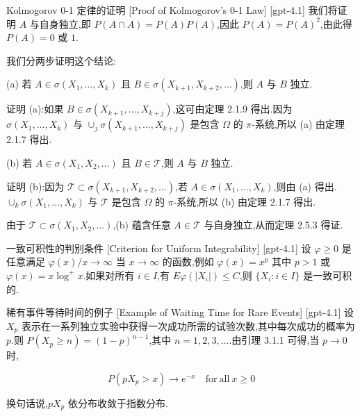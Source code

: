 \documentclass[UTF8]{ctexart}
\begin{document}
    \begin{prf}
        {Kolmogorov 0-1 定律的证明}
        [Proof of Kolmogorov's 0-1 Law]
        [gpt-4.1]
        我们将证明 $A$ 与自身独立,即 $P(A \cap A) = P(A) P(A)$,因此 $P(A) = P(A)^2$,由此得 $P(A) = 0$ 或 $1$.

我们分两步证明这个结论:

(a) 若 $A \in \sigma(X_1, \ldots, X_k)$ 且 $B \in \sigma(X_{k+1}, X_{k+2}, \ldots)$,则 $A$ 与 $B$ 独立.

证明 (a):如果 $B \in \sigma(X_{k+1}, \ldots, X_{k+j})$,这可由定理 2.1.9 得出.因为 $\sigma(X_1, \dots, X_k)$ 与 $\cup_{j} \sigma(X_{k+1}, \ldots, X_{k+j})$ 是包含 $\Omega$ 的 $\pi$-系统,所以 (a) 由定理 2.1.7 得出.

(b) 若 $A \in \sigma(X_1, X_2, \ldots)$ 且 $B \in \mathcal{T}$,则 $A$ 与 $B$ 独立.

证明 (b):因为 $\mathcal{T} \subset \sigma(X_{k+1}, X_{k+2}, \ldots)$,若 $A \in \sigma(X_1, \ldots, X_k)$,则由 (a) 得出.$\cup_{k} \sigma(X_1, \ldots, X_k)$ 与 $\mathcal{T}$ 是包含 $\Omega$ 的 $\pi$-系统,所以 (b) 由定理 2.1.7 得出.

由于 $\mathcal{T} \subset \sigma(X_1, X_2, \ldots)$,(b) 蕴含任意 $A \in \mathcal{T}$ 与自身独立,从而定理 2.5.3 得证.
    \end{prf}
    
    
    
    \begin{thm}
        {一致可积性的判别条件}
        [Criterion for Uniform Integrability]
        [gpt-4.1]
        设 $\varphi \geq 0$ 是任意满足 $\varphi(x)/x \to \infty$ 当 $x \to \infty$ 的函数,例如 $\varphi(x)=x^p$ 其中 $p>1$ 或 $\varphi(x)=x\log^+x$.如果对所有 $i\in I$,有 $E\varphi(|X_i|)\leq C$,则 $\{X_i:i\in I\}$ 是一致可积的.
    \end{thm}
    
    
    
    \begin{xmp}
        {稀有事件等待时间的例子}
        [Example of Waiting Time for Rare Events]
        [gpt-4.1]
        设 $X_p$ 表示在一系列独立实验中获得一次成功所需的试验次数,其中每次成功的概率为 $p$.则 $P(X_p \geq n) = (1 - p)^{n-1}$,其中 $n = 1, 2, 3, \ldots$.由引理 3.1.1 可得,当 $p \to 0$ 时,

\[
P(p X_{p} > x) \to e^{-x} \quad \mathrm{for\ all\ } x \geq 0
\]

换句话说,$p X_{p}$ 依分布收敛于指数分布.

    \end{xmp}
    
\end{document}
